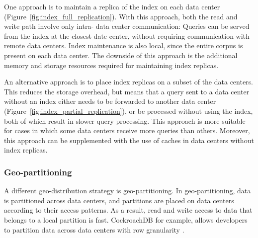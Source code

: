 One approach is to maintain a replica of the index on each data center (Figure~\ref{fig:index_full_replication}).
With this approach, both the read and write path involve only intra- data center communication:
Queries can be served from the index at the closest date center, without requiring communication with
remote data centers.
Index maintenance is also local, since the entire corpus is present on each data center.
The downside of this approach is the additional memory and storage resources required for maintaining index replicas.

An alternative approach is to place index replicas on a subset of the data centers.
This reduces the storage overhead, but means that a query sent to a data center without an index
either needs to be forwarded to another data center (Figure~\ref{fig:index_partial_replication}), or be processed without using the index,
both of which result in slower query processing.
This approach is more suitable for cases in which some data centers receive more queries than others.
Moreover, this approach can be supplemented with the use of caches in data centers without index replicas.


\subsubsection{Geo-partitioning}
A different geo-distribution strategy is geo-partitioning.
In geo-partitioning, data is partitioned across data centers, and partitions are placed on data centers according to
their access patterns.
As a result, read and write access to data that belongs to a local partition is fast.
CockroachDB for example, allows developers to partition data across data centers with row granularity
\cite{cockroachdb:geopartitioning}.

